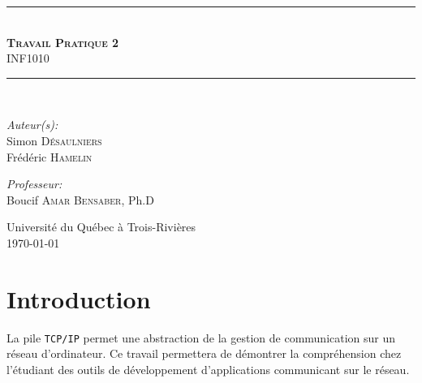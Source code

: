 \documentclass[12pt,french]{article}
\begin{document}
    \begin{titlepage}
        \begin{center}
            \noindent\rule{13cm}{1pt}\\[0.4cm]
            \textsc{\huge \bfseries Travail Pratique 2}\\
                                    INF1010\\[0.4cm]
            \noindent\rule{13cm}{1pt}\\[5cm]
            
            \begin{minipage}{0.4\textwidth}
                \begin{flushleft}
                \large\emph{Auteur(s):}\\[0.5cm]
                    Simon \textsc{Désaulniers}\\
                    Frédéric \textsc{Hamelin}
                \end{flushleft}
            \end{minipage}
            \begin{minipage}{0.5\textwidth}
                \begin{flushright} \large
                    \emph{Professeur:} \\[0.5cm]
                    Boucif \textsc{Amar Bensaber}, Ph.D
                    \vspace{\parskip}
                \end{flushright}
            \end{minipage}
    
            \vfill
            {\large Université du Québec à Trois-Rivières\\ \today}
        \end{center}
        \thispagestyle{empty}
    \end{titlepage}
    \setcounter{page}{1}

    \tableofcontents
    \newpage
    
    \setcounter{page}{1}

    \section{Introduction} %
    \label{sec:intro}
        La pile {\tt TCP/IP} permet une abstraction de la gestion de communication sur un réseau
        d'ordinateur. Ce travail permettera de démontrer la compréhension chez l'étudiant des outils
        de développement d'applications communicant sur le réseau.
\end{document}

